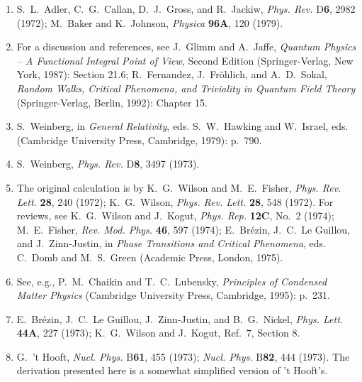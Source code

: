 \begin{enumerate}
  \item[4c.] \label{ch18-ref-4c}
  S.~L.~Adler, C.~G.~Callan, D.~J.~Gross, and R.~Jackiw, \textit{Phys. Rev.} D\textbf{6}, 2982 (1972); M.~Baker and K.~Johnson, \textit{Physica} \textbf{96A}, 120 (1979).

  \item[4d.] \label{ch18-ref-4d}
  For a discussion and references, see J.~Glimm and A.~Jaffe, \textit{Quantum Physics -- A Functional Integral Point of View}, Second Edition (Springer-Verlag, New York, 1987): Section 21.6; R.~Fernandez, J.~Fr\"ohlich, and A.~D.~Sokal, \textit{Random Walks, Critical Phenomena, and Triviality in Quantum Field Theory} (Springer-Verlag, Berlin, 1992): Chapter 15.

  \item {}\label{ch18-ref-5}
  S.~Weinberg, in \textit{General Relativity}, eds. S.~W.~Hawking and W.~Israel, eds. (Cambridge University Press, Cambridge, 1979): p.~790.

  \item {}\label{ch18-ref-6}
  S.~Weinberg, \textit{Phys. Rev.} D\textbf{8}, 3497 (1973).

  \item {}\label{ch18-ref-7}
  The original calculation is by K.~G.~Wilson and M.~E.~Fisher, \textit{Phys. Rev. Lett.} \textbf{28}, 240 (1972); K.~G.~Wilson, \textit{Phys. Rev. Lett.} \textbf{28}, 548 (1972). For reviews, see K.~G.~Wilson and J.~Kogut, \textit{Phys. Rep.} \textbf{12C}, No.~2 (1974); M.~E.~Fisher, \textit{Rev. Mod. Phys.} \textbf{46}, 597 (1974); E.~Br\'ezin, J.~C.~Le Guillou, and J.~Zinn-Justin, in \textit{Phase Transitions and Critical Phenomena}, eds. C.~Domb and M.~S.~Green (Academic Press, London, 1975).

  \item {}\label{ch18-ref-8}
  See, e.g., P.~M.~Chaikin and T.~C.~Lubensky, \textit{Principles of Condensed Matter Physics} (Cambridge University Press, Cambridge, 1995): p.~231.

  \item[8a.] \label{ch18-ref-8a}
  E.~Br\'ezin, J.~C.~Le Guillou, J.~Zinn-Justin, and B.~G.~Nickel, \textit{Phys. Lett.} \textbf{44A}, 227 (1973); K.~G.~Wilson and J.~Kogut, Ref.~7, Section 8.

  \item {}\label{ch18-ref-9}
  G.~'t Hooft, \textit{Nucl. Phys.} B\textbf{61}, 455 (1973); \textit{Nucl. Phys.} B\textbf{82}, 444 (1973). The derivation presented here is a somewhat simplified version of 't Hooft's.


\end{enumerate}
